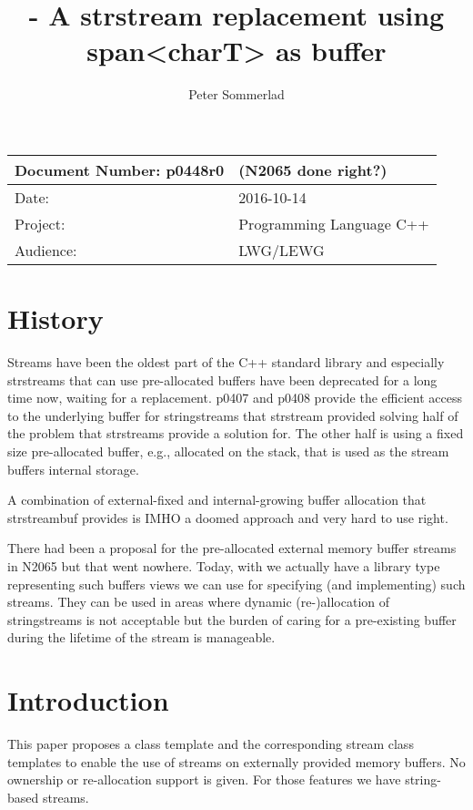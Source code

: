 \documentclass[ebook,11pt,article]{memoir}
\title{\papernumber{} - A strstream replacement using span\textless{}charT\textgreater{} as buffer}
\author{Peter Sommerlad}
\date{\paperdate}                %
\newcommand{\papernumber}{p0448r0}
\newcommand{\paperdate}{2016-10-14}
\begin{document}
\maketitle
\begin{tabular}[t]{|l|l|}\hline 
Document Number: \papernumber & (N2065 done right?)\\\hline
Date: & \paperdate \\\hline
Project: & Programming Language C++\\\hline 
Audience: & LWG/LEWG\\\hline
\end{tabular}

\chapter{History}
Streams have been the oldest part of the C++ standard library and especially strstreams that can use pre-allocated buffers have been deprecated for a long time now, waiting for a replacement. p0407 and p0408 provide the efficient access to the underlying buffer for stringstreams that strstream provided solving half of the problem that strstreams provide a solution for. The other half is using a fixed size pre-allocated buffer, e.g., allocated on the stack, that is used as the stream buffers internal storage.

A combination of external-fixed and internal-growing buffer allocation that strstreambuf provides is IMHO a doomed approach and very hard to use right.

There had been a proposal for the pre-allocated external memory buffer streams in N2065 but that went nowhere. Today, with  we actually have a library type representing such buffers views we can use for specifying (and implementing) such streams. They can be used in areas where dynamic (re-)allocation of stringstreams is not acceptable but the burden of caring for a pre-existing buffer during the lifetime of the stream is manageable. 

\chapter{Introduction}
This paper proposes a class template  and the corresponding stream class templates to enable the use of streams on externally provided memory buffers. No ownership or re-allocation support is given. For those features we have string-based streams.
\end{document}
